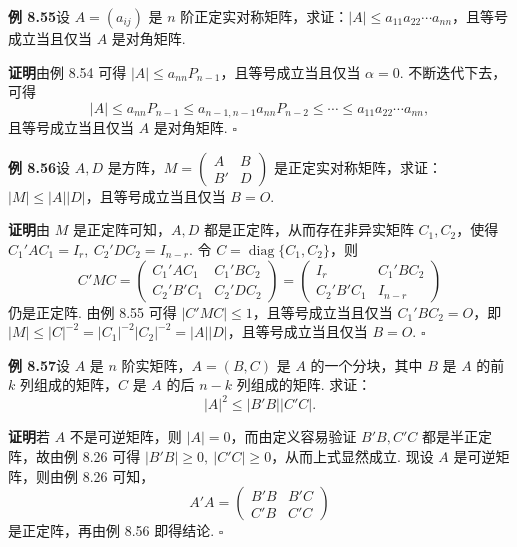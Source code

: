 \documentclass[UTF8,12pt,a4paper,fontset=fandol]{ctexart}
\begin{document}
\noindent\textbf{例 8.55}\quad 设 $A=(a_{ij})$ 是 $n$ 阶正定实对称矩阵，求证：$|A|\le a_{11}a_{22}\cdots a_{nn}$，且等号成立当且仅当 $A$ 是对角矩阵.

\noindent\textbf{证明}\quad 由例 8.54 可得 $|A|\le a_{nn}P_{n-1}$，且等号成立当且仅当 $\alpha=0$. 不断迭代下去，可得
\[
|A|\le a_{nn}P_{n-1}\le a_{n-1,n-1}a_{nn}P_{n-2}\le \cdots\le a_{11}a_{22}\cdots a_{nn},
\]
且等号成立当且仅当 $A$ 是对角矩阵. $\ensuremath{\square}$

\noindent\textbf{例 8.56}\quad 设 $A,D$ 是方阵，$M=\left(\begin{array}{cc}A&B\\ B'&D\end{array}\right)$ 是正定实对称矩阵，求证：$|M|\le |A||D|$，且等号成立当且仅当 $B=O$.

\noindent\textbf{证明}\quad 由 $M$ 是正定阵可知，$A,D$ 都是正定阵，从而存在非异实矩阵 $C_1,C_2$，使得 $C_1'AC_1=I_r,\ C_2'DC_2=I_{n-r}$. 令 $C=\operatorname{diag}\{C_1,C_2\}$，则
\[
C'MC=
\left(\begin{array}{cc}
C_1'AC_1 & C_1'BC_2\\
C_2'B'C_1 & C_2'DC_2
\end{array}\right)
=
\left(\begin{array}{cc}
I_r & C_1'BC_2\\
C_2'B'C_1 & I_{n-r}
\end{array}\right)
\]
仍是正定阵. 由例 8.55 可得 $|C'MC|\le 1$，且等号成立当且仅当 $C_1'BC_2=O$，即 $|M|\le |C|^{-2}=|C_1|^{-2}|C_2|^{-2}=|A||D|$，且等号成立当且仅当 $B=O$. $\ensuremath{\square}$

\noindent\textbf{例 8.57}\quad 设 $A$ 是 $n$ 阶实矩阵，$A=(B,C)$ 是 $A$ 的一个分块，其中 $B$ 是 $A$ 的前 $k$ 列组成的矩阵，$C$ 是 $A$ 的后 $n-k$ 列组成的矩阵. 求证：
\[
|A|^2\le |B'B||C'C|.
\]

\noindent\textbf{证明}\quad 若 $A$ 不是可逆矩阵，则 $|A|=0$，而由定义容易验证 $B'B,C'C$ 都是半正定阵，故由例 8.26 可得 $|B'B|\ge 0,\ |C'C|\ge 0$，从而上式显然成立. 现设 $A$ 是可逆矩阵，则由例 8.26 可知，
\[
A'A=\left(\begin{array}{cc}
B'B & B'C\\
C'B & C'C
\end{array}\right)
\]
是正定阵，再由例 8.56 即得结论. $\ensuremath{\square}$
\end{document}
